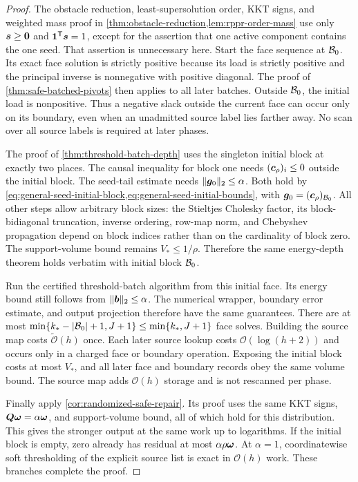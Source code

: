 \begin{proof}
The obstacle reduction, least-supersolution order, KKT signs, and weighted
mass proof in \cref{thm:obstacle-reduction,lem:rppr-order-mass} use only
$\bm{s}\geq\bm{0}$ and $\mathbf{1}^{\mathsf{T}}\bm{s}=1$, except for the assertion that
one active component contains the one seed. That assertion is unnecessary
here. Start the face sequence at $\mathcal{B}_0$. Its exact face solution is
strictly positive because its load is strictly positive and the principal
inverse is nonnegative with positive diagonal. The proof of
\cref{thm:safe-batched-pivots} then applies to all later batches.
Outside $\mathcal{B}_0$, the initial load is nonpositive. Thus a negative slack
outside the current face can occur only on its boundary, even when an
unadmitted source label lies farther away. No scan over all source labels
is required at later phases.

The proof of \cref{thm:threshold-batch-depth} uses the singleton initial
block at exactly two places. The causal inequality for block one needs
$(\bm{c}_\rho)_i\leq0$ outside the initial block. The seed-tail estimate needs
$\lVert\bm{g}_0\rVert_2\leq\alpha$. Both hold by
\cref{eq:general-seed-initial-block,eq:general-seed-initial-bounds}, with
$\bm{g}_0=(\bm{c}_\rho)_{\mathcal{B}_0}$. All other steps allow arbitrary block
sizes: the Stieltjes Cholesky factor, its block-bidiagonal truncation,
inverse ordering, row-map norm, and Chebyshev propagation depend on block
indices rather than on the cardinality of block zero. The support-volume
bound remains $V_*\leq1/\rho$. Therefore the same energy-depth theorem
holds verbatim with initial block $\mathcal{B}_0$.

Run the certified threshold-batch algorithm from this initial face.
Its energy bound still follows from $\lVert\bm{b}\rVert_2\leq\alpha$.
The numerical wrapper, boundary error estimate, and output projection
therefore have the same guarantees. There are at most
$\min\{k_*-|\mathcal{B}_0|+1,J+1\}\leq\min\{k_*,J+1\}$ face solves.
Building the source map costs $\widetilde{\mathcal{O}}(h)$ once. Each later source
lookup costs $\mathcal{O}(\log(h+2))$ and occurs only in a charged face or boundary
operation. Exposing the initial block costs at most $V_*$, and all later
face and boundary records obey the same volume bound. The source map
adds $\mathcal{O}(h)$ storage and is not rescanned per phase.

Finally apply \cref{cor:randomized-safe-repair}. Its proof uses the
same KKT signs, $\bm{Q}\bm{\omega}=\alpha\bm{\omega}$, and support-volume bound,
all of which hold for this distribution. This gives the stronger output
at the same work up to logarithms. If the initial block is empty, zero
already has residual at most $\alpha\rho\bm{\omega}$.
At $\alpha=1$, coordinatewise soft thresholding of the explicit source
list is exact in $\mathcal{O}(h)$ work. These branches complete the proof.
\end{proof}

